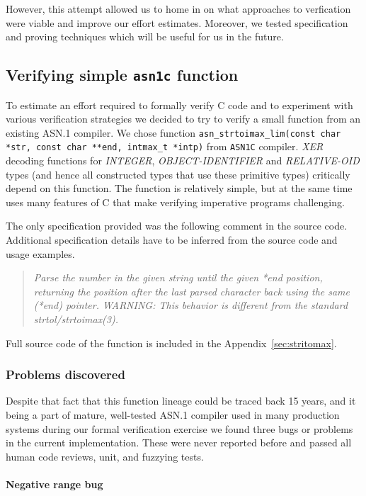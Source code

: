 \documentclass[acmsmall,nonacm]{acmart}
\begin{document}
However, this attempt allowed us to home in on what approaches
to verfication were viable and improve our effort estimates. Moreover, we tested specification and proving techniques which will be useful for us in the future.

\subsection{Verifying simple  \texttt{asn1c} function}

To estimate an effort required to formally verify C code and to
experiment with various verification strategies we decided to try to
verify a small function from an existing ASN.1 compiler. We chose
function \texttt{asn\_strtoimax\_lim(const char *str, const char
  **end, intmax\_t *intp)} from \texttt{ASN1C} compiler.  \emph{XER}
decoding functions for \emph{INTEGER}, \emph{OBJECT-IDENTIFIER} and
\emph{RELATIVE-OID} types (and hence all constructed types that use
these primitive types) critically depend on this function. The
function is relatively simple, but at the same time uses many features
of C that make verifying imperative programs challenging.

The only specification provided was the following comment in the
source code. Additional specification details have to be inferred from
the source code and usage examples.

\begin{quote}
 { \it Parse the number in the given string until the given *end position,
 returning the position after the last parsed character back using the
 same (*end) pointer.
 WARNING: This behavior is different from the standard strtol/strtoimax(3). }
\end{quote}

Full source code of the function is included in the Appendix~\ref{sec:stritomax}.

\subsubsection{Problems discovered}

Despite that fact that this function lineage could be traced back 15
years, and it being a part of mature, well-tested ASN.1 compiler used
in many production systems during our formal verification exercise we
found three bugs or problems in the current implementation. These were
never reported before and passed all human code reviews, unit, and
fuzzying tests.
  
\paragraph{Negative range bug}
\end{document}
